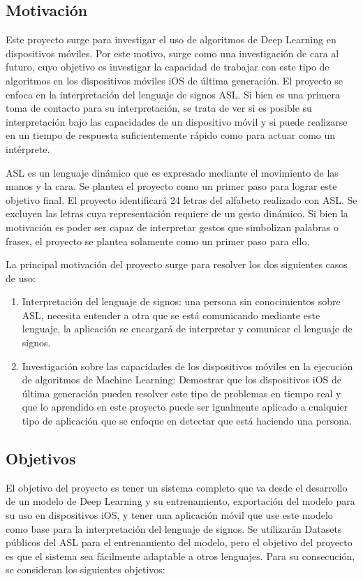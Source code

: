 \documentclass[../main.tex]{subfiles}
\begin{document}
\subsection{Motivación}
Este proyecto surge para investigar el uso de algoritmos de Deep Learning en dispositivos móviles. Por este motivo, surge como una investigación de cara al futuro, cuyo objetivo es investigar la capacidad de trabajar con este tipo de algoritmos en los dispositivos móviles iOS de última generación. 
El proyecto se enfoca en la interpretación del lenguaje de signos ASL.  Si bien es una primera toma de contacto para su interpretación, se trata de ver si es posible su interpretación bajo las capacidades de un dispositivo móvil y si puede realizarse en un tiempo de respuesta suficientemente rápido como para actuar como un intérprete. 

ASL es un lenguaje dinámico que es expresado mediante el movimiento de las manos y la cara. Se plantea el proyecto como un primer paso para lograr este objetivo final. El proyecto identificará 24 letras del alfabeto realizado con ASL. Se excluyen las letras cuya representación requiere de un gesto dinámico. Si bien la motivación es poder ser capaz de interpretar gestos que simbolizan palabras o frases, el proyecto se plantea solamente como un primer paso para ello.

La principal motivación del proyecto surge para resolver los dos siguientes casos de uso:

\begin{enumerate}
    \item Interpretación del lenguaje de signos: una persona sin conocimientos sobre ASL, necesita entender a otra que se está comunicando mediante este lenguaje, la aplicación se encargará de interpretar y comunicar el lenguaje de signos.
    \item Investigación sobre las capacidades de los dispositivos móviles en la ejecución de algoritmos de Machine Learning: Demostrar que los dispositivos iOS de última generación pueden resolver este tipo de problemas en tiempo real y que lo aprendido en este proyecto puede ser igualmente aplicado a cualquier tipo de aplicación que se enfoque en detectar que está haciendo una persona.
\end{enumerate}

\subsection{Objetivos}
El objetivo del proyecto es tener un sistema completo que va desde el desarrollo de un modelo de Deep Learning y su entrenamiento, exportación del modelo para su uso en dispositivos iOS, y tener una aplicación móvil que use este modelo como base para la interpretación del lenguaje de signos.
Se utilizarán Datasets públicos del ASL para el entrenamiento del modelo, pero el objetivo del proyecto es que el sistema sea fácilmente adaptable a otros lenguajes. Para su consecución, se consideran los siguientes objetivos:
\end{document}

